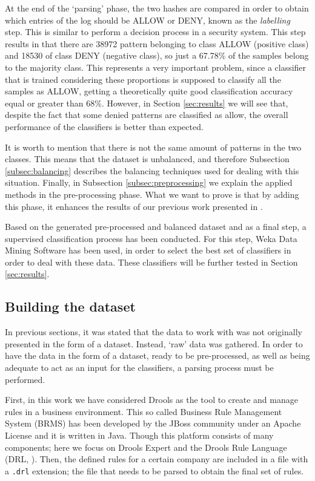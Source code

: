 \documentclass{llncs}
\begin{document}
At the end of the `parsing' phase, the two hashes are compared in order to obtain which entries of the log should be ALLOW or DENY, known as the \textit{labelling} step. This is similar to perform a decision process in a security system. This step results in that there are 38972 pattern belonging to class ALLOW (positive class) and 18530 of class DENY (negative class), so just a 67.78\% of the samples belong to the majority class. This represents a very important problem, since a classifier that is trained considering these proportions is supposed to classify all the samples as ALLOW, getting a theoretically quite good classification accuracy equal or greater than 68\%. However, in Section \ref{sec:results} we will see that, despite the fact that some denied patterns are classified as allow, the overall performance of the classifiers is better than expected.

It is worth to mention that there is not the same amount of patterns in the two classes. This means that the dataset is unbalanced, and therefore Subsection \ref{subsec:balancing} describes the balancing techniques used for dealing with this situation. Finally, in Subsection \ref{subsec:preprocessing} we explain the applied methods in the pre-processing phase. What we want to prove is that by adding this phase, it enhances the results of our previous work presented in \cite{ECTA}.

Based on the generated pre-processed and balanced dataset and as a final step, a supervised classification process \cite{classification_67} has been conducted. For this step, Weka Data Mining Software\cite{weka:site} has been used, in order to select the best set of classifiers in order to deal with these data. These classifiers will be further tested in Section \ref{sec:results}.

%
\subsection{Building the dataset}
\label{sec:buldingdataset}

In previous sections, it was stated that the data to work with was not originally presented in the form of a dataset. Instead, `raw' data was gathered. In order to have the data in the form of a dataset, ready to be pre-processed, as well as being adequate to act as an input for the classifiers, a parsing process must be performed.

First, in this work we have considered Drools \cite{drools:site} as the tool to create and  manage rules in a business environment. This so called Business Rule Management System (BRMS) has been developed by the JBoss community under an Apache License and it is written in Java. Though this platform consists of many components; here we focus on Drools Expert and the Drools Rule Language (DRL, \cite{drools:doc}). Then, the defined rules for a certain company are included in a file with a \texttt{.drl} extension; the file that needs to be parsed to obtain the final set of rules. 
\end{document}
